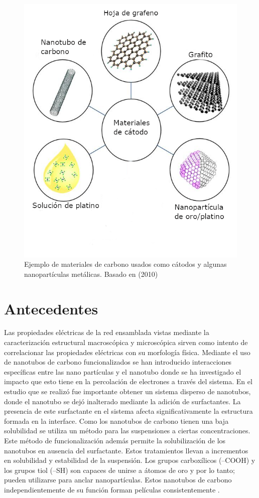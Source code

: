 \documentclass{elsarticle}
\begin{document}
\begin{figure}[ht!]
	\centering
		\includegraphics[scale=1]{catodos.png}
	\caption{Ejemplo de materiales de carbono usados como cátodos y algunas nanopartículas metálicas. Basado en \citet{calandraimg}(2010)}
	\label{fig1}
\end{figure}

\section{Antecedentes}

Las propiedades eléctricas de la red ensamblada vistas mediante la caracterización estructural macroscópica y microscópica sirven como intento de correlacionar las propiedades eléctricas con su morfología física. Mediante el uso de nanotubos de carbono funcionalizados se han introducido interacciones específicas entre las nano partículas y el nanotubo donde se ha investigado el impacto que esto tiene en la percolación de electrones a través del sistema. En el estudio que se realizó fue importante obtener un sistema disperso de nanotubos, donde el nanotubo se dejó inalterado mediante la adición de surfactantes. La presencia de este surfactante en el sistema afecta significativamente la estructura formada en la interface. Como los nanotubos de carbono tienen una baja solubilidad se utiliza un método para las suspensiones a ciertas concentraciones. Este método de funcionalización además permite la solubilización de los nanotubos en ausencia del surfactante. Estos tratamientos llevan a incrementos en solubilidad y estabilidad de la suspensión. Los grupos carboxílicos (–COOH) y los grupos tiol (–SH) son capaces de unirse a átomos de oro y por lo tanto; pueden utilizarse para anclar nanopartículas. Estos nanotubos de carbono independientemente de su función forman películas consistentemente \cite{Marshgrap}. 
\end{document}
